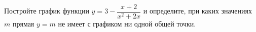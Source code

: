 \begin{ex}
	\begin{condition}
		Постройте график функции \( y=3-\dfrac{x+2}{x^2+2x} \) и определите, при каких значениях \( m \) прямая \( y=m \) не имеет с графиком ни одной общей точки.
	\end{condition}
\end{ex}